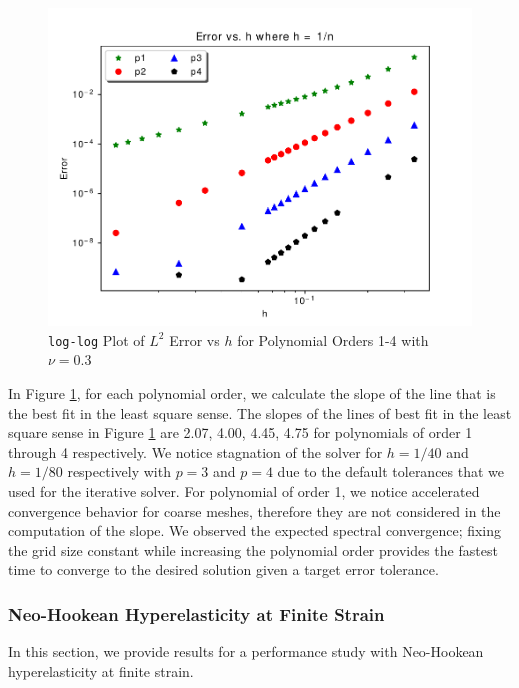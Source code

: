 \begin{figure}[hbt!]
 \begin{center}
      \includegraphics[width=1\textwidth]{../img/conv.pdf}
\end{center}
\caption{
\texttt{log-log} Plot of $L^2$ Error vs $h$ for Polynomial Orders 1-4 with $\nu = 0.3$}
    \label{fig:lin-elas-conv}
\end{figure}

In Figure \ref{fig:lin-elas-conv}, for each polynomial order, we calculate the slope of the line that is the best fit in the least square sense.
The slopes of the lines of best fit in the least square sense in Figure \ref{fig:lin-elas-conv} are 2.07, 4.00, 4.45, 4.75 for polynomials of order 1 through 4 respectively.
We notice stagnation of the solver for $h = 1/40$ and $h = 1/80$ respectively with $p = 3$ and $p = 4$ due to the default tolerances that we used for the iterative solver.
For polynomial of order 1, we notice accelerated convergence behavior for coarse meshes, therefore they are not considered in the computation of the slope.
We observed the expected spectral convergence; fixing the grid size constant while increasing the polynomial order provides the fastest time to converge to the desired solution given a target error tolerance.

\subsubsection{Neo-Hookean Hyperelasticity at Finite Strain}

In this section, we provide results for a performance study with Neo-Hookean hyperelasticity at finite strain.

